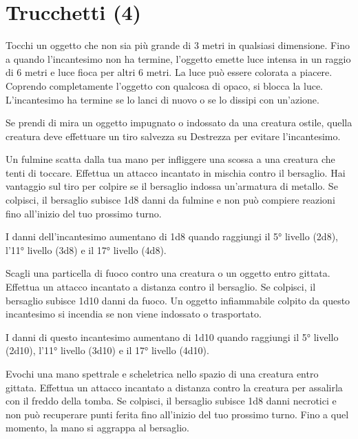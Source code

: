 \documentclass[letterpaper,twocolumn,openany,nodeprecatedcode,justified]{dndbook}
\begin{document}
\section{Trucchetti (4)}


Tocchi un oggetto che non sia più grande di 3 metri in qualsiasi dimensione. Fino a quando l'incantesimo non ha termine, l'oggetto emette luce intensa in un raggio di 6 metri e luce fioca per altri 6 metri. La luce può essere colorata a piacere. Coprendo completamente l'oggetto con qualcosa di opaco, si blocca la luce. L'incantesimo ha termine se lo lanci di nuovo o se lo dissipi con un'azione.

Se prendi di mira un oggetto impugnato o indossato da una creatura ostile, quella creatura deve effettuare un tiro salvezza su Destrezza per evitare l'incantesimo.


Un fulmine scatta dalla tua mano per infliggere una scossa a una creatura che tenti di toccare. Effettua un attacco incantato in mischia contro il bersaglio. Hai vantaggio sul tiro per colpire se il bersaglio indossa un'armatura di metallo. Se colpisci, il bersaglio subisce 1d8 danni da fulmine e non può compiere reazioni fino all'inizio del tuo prossimo turno.

I danni dell'incantesimo aumentano di 1d8 quando raggiungi il 5° livello (2d8), l'11° livello (3d8) e il 17° livello (4d8).


Scagli una particella di fuoco contro una creatura o un oggetto entro gittata. Effettua un attacco incantato a distanza contro il bersaglio. Se colpisci, il bersaglio subisce 1d10 danni da fuoco. Un oggetto infiammabile colpito da questo incantesimo si incendia se non viene indossato o trasportato.

I danni di questo incantesimo aumentano di 1d10 quando raggiungi il 5° livello (2d10), l'11° livello (3d10) e il 17° livello (4d10).


Evochi una mano spettrale e scheletrica nello spazio di una creatura entro gittata. Effettua un attacco incantato a distanza contro la creatura per assalirla con il freddo della tomba. Se colpisci, il bersaglio subisce 1d8 danni necrotici e non può recuperare punti ferita fino all'inizio del tuo prossimo turno. Fino a quel momento, la mano si aggrappa al bersaglio.
\end{document}

